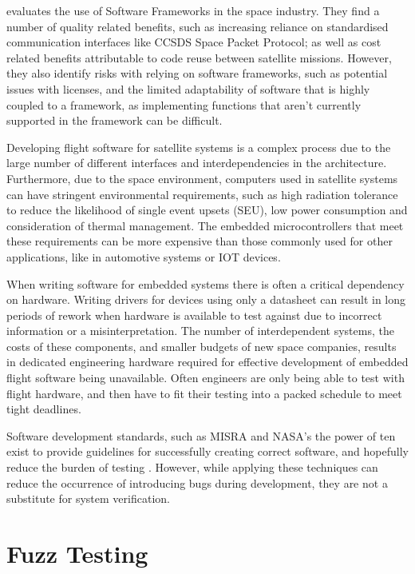 \documentclass[../report.tex]{subfiles}
\begin{document}
\citet{Farges_2022} evaluates the use of Software Frameworks in the space
industry. They find a number of quality related benefits, such as increasing
reliance on standardised communication interfaces like CCSDS Space Packet
Protocol; as well as cost related benefits attributable to code reuse between
satellite missions. However, they also identify risks with relying on software
frameworks, such as potential issues with licenses, and the limited
adaptability of software that is highly coupled to a framework, as implementing
functions that aren't currently supported in the framework can be difficult.

Developing flight software for satellite systems is a complex process due to
the large number of different interfaces and interdependencies in the
architecture. Furthermore, due to the space environment, computers used in
satellite systems can have stringent environmental requirements, such as high
radiation tolerance to reduce the likelihood of single event upsets (SEU), low
power consumption and consideration of thermal management. The embedded
microcontrollers that meet these requirements can be more expensive than those
commonly used for other applications, like in automotive systems or IOT devices.

When writing software for embedded systems there is often a critical dependency
on hardware. Writing drivers for devices using only a datasheet can result in
long periods of rework when hardware is available to test against due to
incorrect information or a misinterpretation. The number of interdependent
systems, the costs of these components, and smaller budgets of new space
companies, results in dedicated engineering hardware required for effective
development of embedded flight software being unavailable. Often engineers are
only being able to test with flight hardware, and then have to fit their
testing into a packed schedule to meet tight deadlines.

Software development standards, such as MISRA and NASA's the power of ten exist
to provide guidelines for successfully creating correct software, and hopefully
reduce the burden of testing \citep{NASA_10}. However, while applying these
techniques can reduce the occurrence of introducing bugs during development,
they are not a substitute for system verification.

\section{Fuzz Testing}
\end{document}
